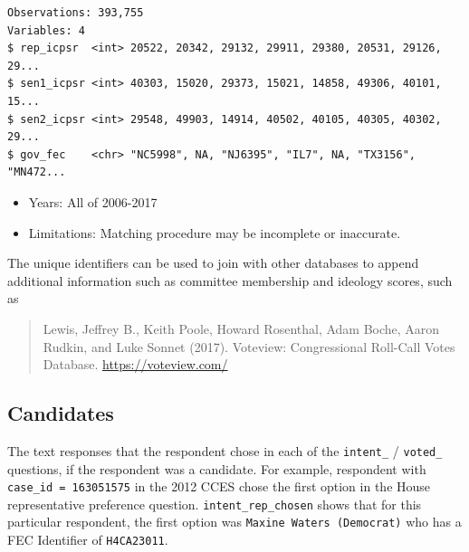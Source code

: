 \documentclass[10pt,article,oneside]{memoir}
\theoremstyle{definition}
\newenvironment{Shaded}{\begin{snugshade}}{\end{snugshade}}
\newcommand{\DecValTok}[1]{\textcolor[rgb]{0.00,0.00,0.81}{#1}}
\newcommand{\KeywordTok}[1]{\textcolor[rgb]{0.13,0.29,0.53}{\textbf{#1}}}
\newcommand{\NormalTok}[1]{#1}
\newcommand{\OperatorTok}[1]{\textcolor[rgb]{0.81,0.36,0.00}{\textbf{#1}}}
\newcommand{\StringTok}[1]{\textcolor[rgb]{0.31,0.60,0.02}{#1}}
\begin{document}
\begin{verbatim}
Observations: 393,755
Variables: 4
$ rep_icpsr  <int> 20522, 20342, 29132, 29911, 29380, 20531, 29126, 29...
$ sen1_icpsr <int> 40303, 15020, 29373, 15021, 14858, 49306, 40101, 15...
$ sen2_icpsr <int> 29548, 49903, 14914, 40502, 40105, 40305, 40302, 29...
$ gov_fec    <chr> "NC5998", NA, "NJ6395", "IL7", NA, "TX3156", "MN472...
\end{verbatim}

\begin{itemize}
\tightlist
\item
  Years: All of 2006-2017
\item
  Limitations: Matching procedure may be incomplete or inaccurate.
\end{itemize}

The unique identifiers can be used to join with other databases to
append additional information such as committee membership and ideology
scores, such as

\begin{quote}
Lewis, Jeffrey B., Keith Poole, Howard Rosenthal, Adam Boche, Aaron
Rudkin, and Luke Sonnet (2017). Voteview: Congressional Roll-Call Votes
Database. \url{https://voteview.com/}
\end{quote}

\hypertarget{candidates}{%
\subsection{Candidates}\label{candidates}}

The text responses that the respondent chose in each of the
\texttt{intent\_} / \texttt{voted\_} questions, if the respondent was a
candidate. For example, respondent with \texttt{case\_id\ =\ 163051575}
in the 2012 CCES chose the first option in the House representative
preference question. \texttt{intent\_rep\_chosen} shows that for this
particular respondent, the first option was
\texttt{Maxine\ Waters\ (Democrat)} who has a FEC Identifier of
\texttt{H4CA23011}.

\begin{Shaded}
\end{Shaded}
\end{document}
